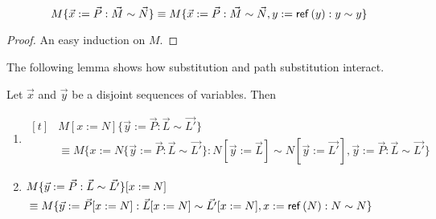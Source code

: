 
\begin{lm}
\[ M \{ \vec{x} := \vec{P} : \vec{M} \sim \vec{N} \} \equiv M \{ \vec{x} := \vec{P} : \vec{M} \sim \vec{N}, y := \mathsf{ref} \left( {y} \right) : y \sim y \} \]
\end{lm}

\begin{proof}
An easy induction on $M$.
\end{proof}

The following lemma shows how substitution and path substitution interact.

\begin{lm}[Substitution]
\label{lm:subpathsub}
Let $\vec{x}$ and $\vec{y}$ be a disjoint sequences of variables.  Then
\begin{enumerate}
\item
\label{lm:subpathsubi}
$ \begin{aligned}[t]
& M [ x:= N ] \{ \vec{y} := \vec{P} : \vec{L} \sim \vec{L'} \} \\
& \equiv M \{ x := N \{ \vec{y} := \vec{P} : \vec{L} \sim \vec{L'} \} : N [ \vec{y}:= \vec{L} ] \sim N [ \vec{y} := \vec{L'} ], \vec{y} := \vec{P} : \vec{L} \sim \vec{L'} \}
\end{aligned} $
\item
\label{lm:subpathsubii}
$ \begin{aligned}[t]
& M \{ \vec{y} := \vec{P} : \vec{L} \sim \vec{L'} \} [ x := N ] \\
& \equiv M \{ \vec{y} := \vec{P} [x := N] : \vec{L} [x := N] \sim \vec{L'} [x := N], x := \mathsf{ref} \left( {N} \right) : N \sim N \}
\end{aligned} $
\end{enumerate}
\end{lm}

